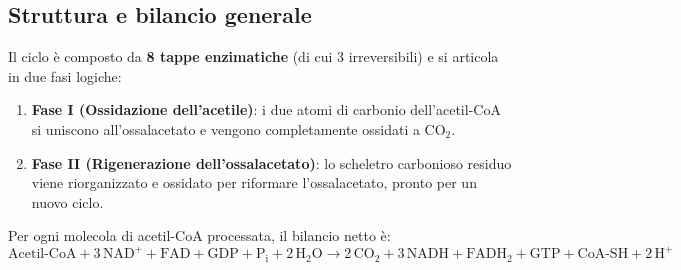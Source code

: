\documentclass[12pt,a4paper]{report}
\begin{document}
\subsection{Struttura e bilancio generale}
Il ciclo è composto da \textbf{8 tappe enzimatiche} (di cui 3 irreversibili) e si articola in due fasi logiche:
\begin{enumerate}
\item \textbf{Fase I (Ossidazione dell'acetile)}: i due atomi di carbonio dell'acetil-CoA si uniscono all'ossalacetato e vengono completamente ossidati a \(\mathrm{CO_2}\).
\item \textbf{Fase II (Rigenerazione dell'ossalacetato)}: lo scheletro carbonioso residuo viene riorganizzato e ossidato per riformare l'ossalacetato, pronto per un nuovo ciclo.
\end{enumerate}
Per ogni molecola di acetil-CoA processata, il bilancio netto è:
\[
\text{Acetil-CoA} + 3\,\mathrm{NAD^+} + \mathrm{FAD} + \mathrm{GDP} + \mathrm{P_i} + 2\,\mathrm{H_2O} \rightarrow 2\,\mathrm{CO_2} + 3\,\mathrm{NADH} + \mathrm{FADH_2} + \mathrm{GTP} + \text{CoA-SH} + 2\,\mathrm{H^+}
\]
\end{document}
